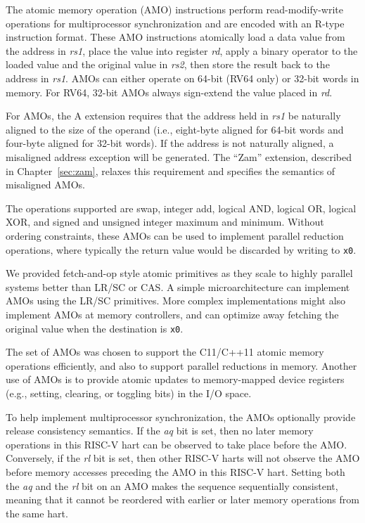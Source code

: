 \vspace{-0.1in} The atomic memory operation (AMO) instructions perform
read-modify-write operations for multiprocessor synchronization and
are encoded with an R-type instruction format.  These AMO instructions
atomically load a data value from the address in {\em rs1}, place the
value into register {\em rd}, apply a binary operator to the loaded
value and the original value in {\em rs2}, then store the result back
to the address in {\em rs1}. AMOs can either operate on 64-bit (RV64
only) or 32-bit words in memory.  For RV64, 32-bit AMOs always
sign-extend the value placed in {\em rd}.

For AMOs, the A extension requires that the address held in {\em rs1} be
naturally aligned to the size of the operand (i.e., eight-byte aligned for
64-bit words and four-byte aligned for 32-bit words).  If the address is
not naturally aligned, a misaligned address exception will be generated.
The ``Zam'' extension, described in Chapter~\ref{sec:zam}, relaxes this
requirement and specifies the semantics of misaligned AMOs.

The operations supported are swap, integer add, logical AND, logical
OR, logical XOR, and signed and unsigned integer maximum and minimum.
Without ordering constraints, these AMOs can be used to implement
parallel reduction operations, where typically the return value would
be discarded by writing to {\tt x0}.

\begin{commentary}
We provided fetch-and-op style atomic primitives as they scale to
highly parallel systems better than LR/SC or CAS.  A simple
microarchitecture can implement AMOs using the LR/SC primitives.  More
complex implementations might also implement AMOs at memory
controllers, and can optimize away fetching the original value when
the destination is {\tt x0}.

The set of AMOs was chosen to support the C11/C++11 atomic memory
operations efficiently, and also to support parallel reductions in
memory.  Another use of AMOs is to provide atomic updates to
memory-mapped device registers (e.g., setting, clearing, or toggling
bits) in the I/O space.
\end{commentary}

To help implement multiprocessor synchronization, the AMOs optionally
provide release consistency semantics.  If the {\em aq} bit is set,
then no later memory operations in this RISC-V hart can be observed
to take place before the AMO.
Conversely, if the {\em rl} bit is set, then other
RISC-V harts will not observe the AMO before memory accesses
preceding the AMO in this RISC-V hart.  Setting both the {\em aq} and the {\em
rl} bit on an AMO makes the sequence sequentially consistent, meaning that
it cannot be reordered with earlier or later memory operations from the same
hart.

